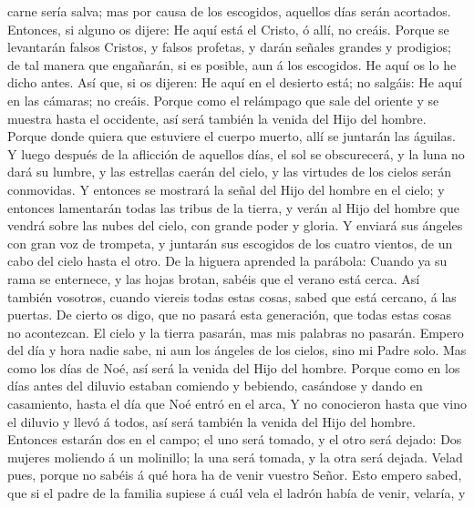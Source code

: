 carne sería salva; mas por causa de los escogidos, aquellos días serán
acortados.  Entonces, si alguno os dijere: He aquí está
el Cristo, ó allí, no creáis.  Porque se levantarán
falsos Cristos, y falsos profetas, y darán señales grandes y prodigios;
de tal manera que engañarán, si es posible, aun á los escogidos.
 He aquí os lo he dicho antes.  Así que,
si os dijeren: He aquí en el desierto está; no salgáis: He aquí en las
cámaras; no creáis.  Porque como el relámpago que sale
del oriente y se muestra hasta el occidente, así será también la venida
del Hijo del hombre.  Porque donde quiera que estuviere
el cuerpo muerto, allí se juntarán las águilas.  Y luego
después de la aflicción de aquellos días, el sol se obscurecerá, y la
luna no dará su lumbre, y las estrellas caerán del cielo, y las virtudes
de los cielos serán conmovidas.  Y entonces se mostrará
la señal del Hijo del hombre en el cielo; y entonces lamentarán todas
las tribus de la tierra, y verán al Hijo del hombre que vendrá sobre las
nubes del cielo, con grande poder y gloria.  Y enviará
sus ángeles con gran voz de trompeta, y juntarán sus escogidos de los
cuatro vientos, de un cabo del cielo hasta el otro.  De
la higuera aprended la parábola: Cuando ya su rama se enternece, y las
hojas brotan, sabéis que el verano está cerca.  Así
también vosotros, cuando viereis todas estas cosas, sabed que está
cercano, á las puertas.  De cierto os digo, que no pasará
esta generación, que todas estas cosas no acontezcan.  El
cielo y la tierra pasarán, mas mis palabras no pasarán. 
Empero del día y hora nadie sabe, ni aun los ángeles de los cielos, sino
mi Padre solo.  Mas como los días de Noé, así será la
venida del Hijo del hombre.  Porque como en los días
antes del diluvio estaban comiendo y bebiendo, casándose y dando en
casamiento, hasta el día que Noé entró en el arca,  Y no
conocieron hasta que vino el diluvio y llevó á todos, así será también
la venida del Hijo del hombre.  Entonces estarán dos en
el campo; el uno será tomado, y el otro será dejado:  Dos
mujeres moliendo á un molinillo; la una será tomada, y la otra será
dejada.  Velad pues, porque no sabéis á qué hora ha de
venir vuestro Señor.  Esto empero sabed, que si el padre
de la familia supiese á cuál vela el ladrón había de venir, velaría, y
